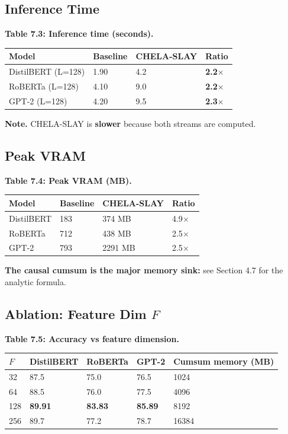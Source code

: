 \subsection{Inference Time}

\textbf{Table 7.3: Inference time (seconds).}

\begin{table}[H]
\centering
\small
\begin{tabular}{llll}
\toprule
\textbf{Model} & \textbf{Baseline} & \textbf{CHELA-SLAY} & \textbf{Ratio} \\
\midrule
DistilBERT (L=128) & 1.90 & 4.2 & \textbf{2.2$\times$} \\
RoBERTa (L=128) & 4.10 & 9.0 & \textbf{2.2$\times$} \\
GPT-2 (L=128) & 4.20 & 9.5 & \textbf{2.3$\times$} \\
\bottomrule
\end{tabular}
\end{table}

\textbf{Note.} CHELA-SLAY is \textbf{slower} because both streams are computed.

\subsection{Peak VRAM}

\textbf{Table 7.4: Peak VRAM (MB).}

\begin{table}[H]
\centering
\small
\begin{tabular}{llll}
\toprule
\textbf{Model} & \textbf{Baseline} & \textbf{CHELA-SLAY} & \textbf{Ratio} \\
\midrule
DistilBERT & 183 & 374 MB & 4.9$\times$ \\
RoBERTa & 712 & 438 MB & 2.5$\times$ \\
GPT-2 & 793 & 2291 MB & 2.5$\times$ \\
\bottomrule
\end{tabular}
\end{table}

\textbf{The causal cumsum is the major memory sink:} see Section 4.7 for the 
analytic formula.

\subsection{Ablation: Feature Dim $F$}

\textbf{Table 7.5: Accuracy vs feature dimension.}

\begin{table}[H]
\centering
\small
\begin{tabular}{lllll}
\toprule
\textbf{$F$} & \textbf{DistilBERT} & \textbf{RoBERTa} & \textbf{GPT-2} & \textbf{Cumsum memory (MB)} \\
\midrule
32 & 87.5 & 75.0 & 76.5 & 1024 \\
64 & 88.5 & 76.0 & 77.5 & 4096 \\
128 & \textbf{89.91} & \textbf{83.83} & \textbf{85.89} & 8192 \\
256 & 89.7 & 77.2 & 78.7 & 16384 \\
\bottomrule
\end{tabular}
\end{table}

